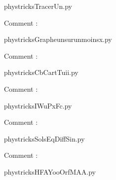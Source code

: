     \newcommand{\CaptionFigTracerUn}{<+Type your caption here+>}
    \begin{center}
        
    \end{center}
    phystricksTracerUn.py

    Comment : 

    \clearpage
    


    \newcommand{\CaptionFigGrapheunsurunmoinsx}{<+Type your caption here+>}
    \begin{center}
        
    \end{center}
    phystricksGrapheunsurunmoinsx.py

    Comment : 

    \clearpage
    


    \newcommand{\CaptionFigCbCartTuii}{<+Type your caption here+>}
    \begin{center}
        
    \end{center}
    phystricksCbCartTuii.py

    Comment : 

    \clearpage
    


    \newcommand{\CaptionFigIWuPxFc}{<+Type your caption here+>}
    \begin{center}
        
    \end{center}
    phystricksIWuPxFc.py

    Comment : 

    \clearpage
    


    \newcommand{\CaptionFigSolsEqDiffSin}{<+Type your caption here+>}
    \begin{center}
        
    \end{center}
    phystricksSolsEqDiffSin.py

    Comment : 

    \clearpage
    


    \newcommand{\CaptionFigHFAYooOrfMAA}{<+Type your caption here+>}
    \begin{center}
        
    \end{center}
    phystricksHFAYooOrfMAA.py

